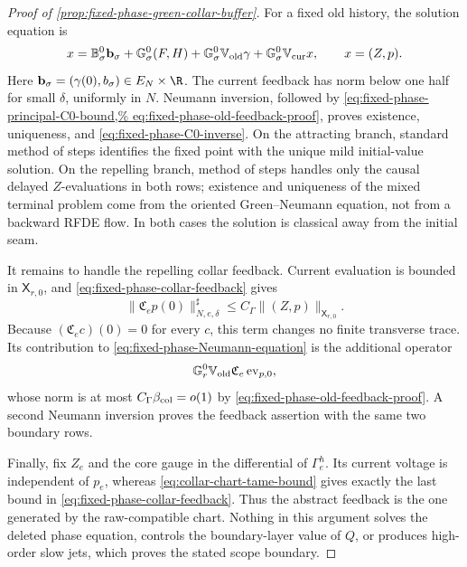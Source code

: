 \begin{proof}[Proof of
\cref{prop:fixed-phase-green-collar-buffer}]
For a fixed old history, the solution equation is
\begin{equation}
 x=\mathbb B_\sigma^0\mathbf b_\sigma+\mathbb G_\sigma^0(F,H)
   +\mathbb G_\sigma^0\mathbb V_{\rm old}\gamma
   +\mathbb G_\sigma^0\mathbb V_{\rm cur}x,\qquad x=(Z,p).  \label{eq:fixed-phase-Neumann-equation}
\end{equation}
Here \(\mathbf b_\sigma=(\gamma(0),b_\sigma)\in E_N\times\R\).
The current feedback has norm below one half for small \(\delta\), uniformly
in \(N\).  Neumann inversion, followed by
\cref{eq:fixed-phase-principal-C0-bound,%
eq:fixed-phase-old-feedback-proof}, proves existence, uniqueness, and
\cref{eq:fixed-phase-C0-inverse}.  On the attracting branch, standard
method of steps identifies the fixed point with the unique mild initial-value
solution.  On the repelling branch, method of steps handles only the causal
delayed \(Z\)-evaluations in both rows; existence and uniqueness of the mixed
terminal problem come from the oriented Green--Neumann equation, not from a
backward RFDE flow.  In both cases the solution is classical away from the
initial seam.

It remains to handle the repelling collar feedback.  Current evaluation is
bounded in \(\mathsf X_{r,0}\), and
\cref{eq:fixed-phase-collar-feedback} gives
\begin{equation*}
 \|\mathfrak C_ep(0)\|_{N,e,\delta}^{\sharp}
 \le C_\Gamma\|(Z,p)\|_{\mathsf X_{r,0}}.
\end{equation*}
Because \((\mathfrak C_ec)(0)=0\) for every \(c\), this term changes no finite transverse
trace.  Its contribution to \cref{eq:fixed-phase-Neumann-equation} is the
additional operator
\begin{equation*}
 \mathbb G_r^0\mathbb V_{\rm old}\mathfrak C_e
       \operatorname{ev}_{p,0},
\end{equation*}
whose norm is at most \(C_\Gamma\beta_{\rm col}=o(1)\) by
\cref{eq:fixed-phase-old-feedback-proof}.  A second Neumann inversion proves
the feedback assertion with the same two boundary rows.

Finally, fix \(Z_e\) and the core gauge in the differential of
\(\Gamma_e^h\).  Its current voltage is independent of \(p_e\), whereas
\cref{eq:collar-chart-tame-bound} gives exactly the last bound in
\cref{eq:fixed-phase-collar-feedback}.  Thus the abstract feedback is the
one generated by the raw-compatible chart.  Nothing in this argument solves
the deleted phase equation, controls the boundary-layer value of \(Q\), or
produces high-order slow jets, which proves the stated scope boundary.
\end{proof}

